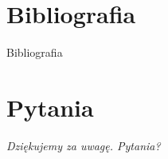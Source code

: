 \documentclass[12pt]{beamer}
\begin{document}
\section{Bibliografia}
\begin{frame}{Bibliografia}
	
\end{frame}

\section*{Pytania}
\begin{frame}
	\centering \Large\emph{Dziękujemy za uwagę. Pytania?}
\end{frame}
\end{document}

